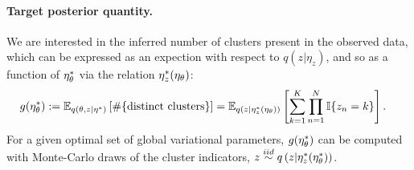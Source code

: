 

\paragraph{Target posterior quantity.}

We are interested in the inferred number of clusters present in the observed
data, which can be expressed as an expection with respect to
$q\left(z \vert \eta_z \right)$, and so as a function of
$\eta_\theta^{*}$ via the relation $\eta_z^{*}(\eta_\theta)$:
%
\begin{align}
g(\eta_\theta^{*}) &:=
\mathbb{E}_{q(\theta, z \vert \eta^{*})} \left[ \#\{\text{distinct clusters}\} \right]  =
\mathbb{E}_{q(z \vert \eta_z^{*}(\eta_\theta))} \left[
    \sum_{k=1}^K \prod_{n=1}^N \mathbb{I}\{z_n = k\} \right].
    \label{eq:expected_num_clusters}
\end{align}
%
For a given optimal set of global variational parameters,
$g(\eta_\theta^{*})$ can be computed with Monte-Carlo draws of the cluster
indicators,
$z \stackrel{iid}{\sim} q\left(z \vert \eta_z^{*}(\eta_\theta^{*})\right)$.

%
%
